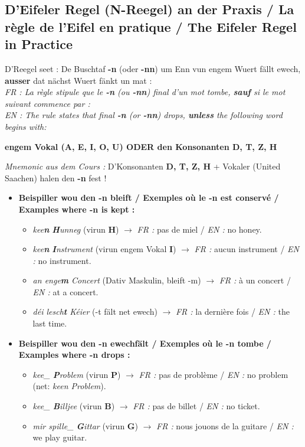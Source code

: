 \subsection{D'Eifeler Regel (N-Reegel) an der Praxis / La règle de l'Eifel en pratique / The Eifeler Regel in Practice}

D'Reegel seet : De Buschtaf \textbf{-n} (oder \textbf{-nn}) um Enn vun engem Wuert fällt ewech, \textbf{ausser} dat nächst Wuert fänkt un mat : \\
\textit{FR : La règle stipule que le \textbf{-n} (ou \textbf{-nn}) final d'un mot tombe, \textbf{sauf} si le mot suivant commence par :} \\
\textit{EN : The rule states that final \textbf{-n} (or \textbf{-nn}) drops, \textbf{unless} the following word begins with:}
\begin{center}
    \textbf{engem Vokal (A, E, I, O, U) \quad ODER \quad den Konsonanten D, T, Z, H}
\end{center}

\textit{Mnemonic aus dem Cours :} D'Konsonanten \textbf{D, T, Z, H} + Vokaler (United Saachen) halen den \textbf{-n} fest !

\begin{itemize}
    \item \textbf{Beispiller wou den -n bleift / Exemples où le -n est conservé / Examples where -n is kept :}
    \begin{itemize}
        \item \textit{kee\textbf{n} \textbf{H}unneg} (virun \textbf{H}) $\rightarrow$ \textit{FR :} pas de miel / \textit{EN :} no honey.
        \item \textit{kee\textbf{n} \textbf{I}nstrument} (virun engem Vokal \textbf{I}) $\rightarrow$ \textit{FR :} aucun instrument / \textit{EN :} no instrument.
        \item \textit{an enge\textbf{m} Concert} (Dativ Maskulin, bleift -m) $\rightarrow$ \textit{FR :} à un concert / \textit{EN :} at a concert.
        \item \textit{déi lesch\textbf{t} Kéier} (-t fält net ewech) $\rightarrow$ \textit{FR :} la dernière fois / \textit{EN :} the last time.
    \end{itemize}
    \item \textbf{Beispiller wou den -n ewechfält / Exemples où le -n tombe / Examples where -n drops :}
    \begin{itemize}
        \item \textit{kee\_ \textbf{P}roblem} (virun \textbf{P}) $\rightarrow$ \textit{FR :} pas de problème / \textit{EN :} no problem (net: \textit{\flqq keen Problem\frqq}).
        \item \textit{kee\_ \textbf{B}illjee} (virun \textbf{B}) $\rightarrow$ \textit{FR :} pas de billet / \textit{EN :} no ticket.
        \item \textit{mir spille\_ \textbf{G}ittar} (virun \textbf{G}) $\rightarrow$ \textit{FR :} nous jouons de la guitare / \textit{EN :} we play guitar.
    \end{itemize}
\end{itemize}

